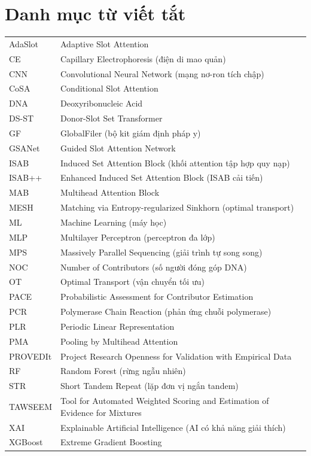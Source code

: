 \documentclass[12pt,a4paper]{article}
\begin{document}
\newpage
\section*{Danh mục từ viết tắt}

\begin{longtable}{@{}P{3.5cm}P{11.5cm}@{}}
AdaSlot   & Adaptive Slot Attention \\
CE        & Capillary Electrophoresis (điện di mao quản) \\
CNN       & Convolutional Neural Network (mạng nơ-ron tích chập) \\
CoSA      & Conditional Slot Attention \\
DNA       & Deoxyribonucleic Acid \\
DS-ST     & Donor-Slot Set Transformer \\
GF        & GlobalFiler (bộ kit giám định pháp y) \\
GSANet    & Guided Slot Attention Network \\
ISAB      & Induced Set Attention Block (khối attention tập hợp quy nạp) \\
ISAB++    & Enhanced Induced Set Attention Block (ISAB cải tiến) \\
MAB       & Multihead Attention Block \\
MESH      & Matching via Entropy-regularized Sinkhorn (optimal transport) \\
ML        & Machine Learning (máy học) \\
MLP       & Multilayer Perceptron (perceptron đa lớp) \\
MPS       & Massively Parallel Sequencing (giải trình tự song song) \\
NOC       & Number of Contributors (số người đóng góp DNA) \\
OT        & Optimal Transport (vận chuyển tối ưu) \\
PACE      & Probabilistic Assessment for Contributor Estimation \\
PCR       & Polymerase Chain Reaction (phản ứng chuỗi polymerase) \\
PLR       & Periodic Linear Representation \\
PMA       & Pooling by Multihead Attention \\
PROVEDIt  & Project Research Openness for Validation with Empirical Data \\
RF        & Random Forest (rừng ngẫu nhiên) \\
STR       & Short Tandem Repeat (lặp đơn vị ngắn tandem) \\
TAWSEEM   & Tool for Automated Weighted Scoring and Estimation of Evidence for Mixtures \\
XAI       & Explainable Artificial Intelligence (AI có khả năng giải thích) \\
XGBoost   & Extreme Gradient Boosting \\
\end{longtable}
\end{document}
